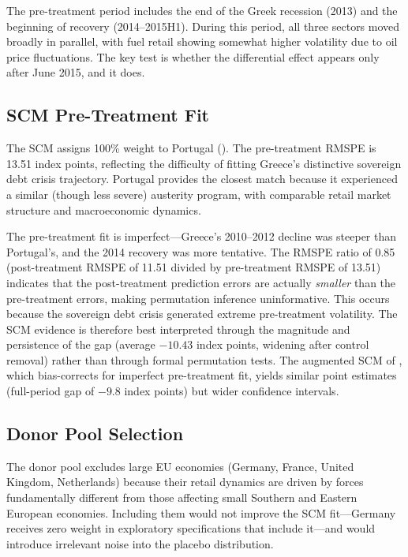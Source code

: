 \documentclass[12pt]{article}
\begin{document}
The pre-treatment period includes the end of the Greek recession (2013) and the beginning of recovery (2014--2015H1). During this period, all three sectors moved broadly in parallel, with fuel retail showing somewhat higher volatility due to oil price fluctuations. The key test is whether the differential effect appears only after June 2015, and it does.

\subsection{SCM Pre-Treatment Fit}

The SCM assigns 100\% weight to Portugal (). The pre-treatment RMSPE is 13.51 index points, reflecting the difficulty of fitting Greece's distinctive sovereign debt crisis trajectory. Portugal provides the closest match because it experienced a similar (though less severe) austerity program, with comparable retail market structure and macroeconomic dynamics.

The pre-treatment fit is imperfect---Greece's 2010--2012 decline was steeper than Portugal's, and the 2014 recovery was more tentative. The RMSPE ratio of 0.85 (post-treatment RMSPE of 11.51 divided by pre-treatment RMSPE of 13.51) indicates that the post-treatment prediction errors are actually \emph{smaller} than the pre-treatment errors, making permutation inference uninformative. This occurs because the sovereign debt crisis generated extreme pre-treatment volatility. The SCM evidence is therefore best interpreted through the magnitude and persistence of the gap (average $-10.43$ index points, widening after control removal) rather than through formal permutation tests. The augmented SCM of \citet{benmichael2021augmented}, which bias-corrects for imperfect pre-treatment fit, yields similar point estimates (full-period gap of $-9.8$ index points) but wider confidence intervals.

\subsection{Donor Pool Selection}

The donor pool excludes large EU economies (Germany, France, United Kingdom, Netherlands) because their retail dynamics are driven by forces fundamentally different from those affecting small Southern and Eastern European economies. Including them would not improve the SCM fit---Germany receives zero weight in exploratory specifications that include it---and would introduce irrelevant noise into the placebo distribution.
\end{document}
